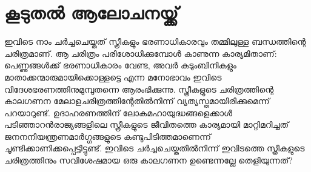 \section{കൂടുതൽ ആലോചനയ്ക്ക്}

ഇവിടെ നാം ചർച്ചചെയ്തത് സ്ത്രീകളും ഭരണാധികാരവും തമ്മിലുള്ള ബന്ധത്തിന്റെ ചരിത്രമാണ്. ആ ചരിത്രം പരിശോധിക്കുമ്പോൾ കാണുന്ന കാര്യമിതാണ്: പെണ്ണുങ്ങൾക്ക് ഭരണാധികാരം വേണ്ട, അവർ കുടുംബിനികളും മാതാക്കന്മാരുമായിക്കൊള്ളട്ടെ എന്ന മനോഭാവം ഇവിടെ വിദേശഭരണത്തിനുമുമ്പുതന്നെ ആരംഭിക്കുന്നു. സ്ത്രീകളുടെ ചരിത്രത്തിന്റെ കാലഗണന മേലാളചരിത്രത്തിന്റേതിൽനിന്ന് വ്യത്യസ്തമായിരിക്കുമെന്ന് പറയാറുണ്ട്. ഉദാഹരണത്തിന് ലോകമഹായുദ്ധങ്ങളെക്കാൾ പടിഞ്ഞാറൻരാജ്യങ്ങളിലെ സ്ത്രീകളുടെ ജീവിതത്തെ കാര്യമായി മാറ്റിമറിച്ചത് ജനനനിയന്ത്രണമാർഗ്ഗങ്ങളുടെ കണ്ടുപിടിത്തമാണെന്ന് ചൂണ്ടിക്കാണിക്കപ്പെട്ടിട്ടുണ്ട്. ഇവിടെ ചർച്ചചെയ്തതിൽനിന്ന് ഇവിടത്തെ സ്ത്രീകളുടെ ചരിത്രത്തിനും സവിശേഷമായ ഒരു കാലഗണന ഉണ്ടെന്നല്ലേ തെളിയുന്നത്?

